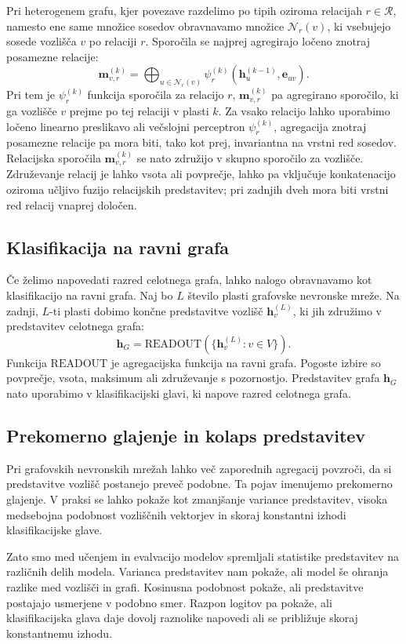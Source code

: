 Pri heterogenem grafu, kjer povezave razdelimo po tipih oziroma relacijah $r \in \mathcal{R}$, namesto ene same množice sosedov obravnavamo množice $\mathcal{N}_r(v)$, ki vsebujejo sosede vozlišča $v$ po relaciji $r$.
Sporočila se najprej agregirajo ločeno znotraj posamezne relacije:
\begin{equation}
    \mathbf{m}_{v,r}^{(k)} =
    \bigoplus_{u \in \mathcal{N}_r(v)}
    \psi_r^{(k)}
    \left(
        \mathbf{h}_u^{(k-1)},
        \mathbf{e}_{uv}
    \right).
\end{equation}
Pri tem je $\psi_r^{(k)}$ funkcija sporočila za relacijo $r$, $\mathbf{m}_{v,r}^{(k)}$ pa agregirano sporočilo, ki ga vozlišče $v$ prejme po tej relaciji v plasti $k$.
Za vsako relacijo lahko uporabimo ločeno linearno preslikavo ali večslojni perceptron $\psi_r^{(k)}$, agregacija znotraj posamezne relacije pa mora biti, tako kot prej, invariantna na vrstni red sosedov.
Relacijska sporočila $\mathbf{m}_{v,r}^{(k)}$ se nato združijo v skupno sporočilo za vozlišče.
Združevanje relacij je lahko vsota ali povprečje, lahko pa vključuje konkatenacijo oziroma učljivo fuzijo relacijskih predstavitev; pri zadnjih dveh mora biti vrstni red relacij vnaprej določen.

\subsection{Klasifikacija na ravni grafa}
\label{subsec:grafovska-klasifikacija}

Če želimo napovedati razred celotnega grafa, lahko nalogo obravnavamo kot klasifikacijo na ravni grafa.
Naj bo $L$ število plasti grafovske nevronske mreže. Na zadnji, $L$-ti plasti dobimo končne predstavitve vozlišč $\mathbf{h}_v^{(L)}$, ki jih združimo v predstavitev celotnega grafa:
\begin{equation}
    \mathbf{h}_G =
    \text{READOUT}
    \left(
        \{\mathbf{h}_v^{(L)} : v \in V\}
    \right).
\end{equation}
Funkcija $\text{READOUT}$ je agregacijska funkcija na ravni grafa.
Pogoste izbire so povprečje, vsota, maksimum ali združevanje s pozornostjo.
Predstavitev grafa $\mathbf{h}_G$ nato uporabimo v klasifikacijski glavi, ki napove razred celotnega grafa.

\subsection{Prekomerno glajenje in kolaps predstavitev}
\label{subsec:oversmoothing}

Pri grafovskih nevronskih mrežah lahko več zaporednih agregacij povzroči, da si predstavitve vozlišč postanejo preveč podobne.
Ta pojav imenujemo prekomerno glajenje.
V praksi se lahko pokaže kot zmanjšanje variance predstavitev, visoka medsebojna podobnost vozliščnih vektorjev in skoraj konstantni izhodi klasifikacijske glave.

Zato smo med učenjem in evalvacijo modelov spremljali statistike predstavitev na različnih delih modela.
Varianca predstavitev nam pokaže, ali model še ohranja razlike med vozlišči in grafi.
Kosinusna podobnost pokaže, ali predstavitve postajajo usmerjene v podobno smer.
Razpon logitov pa pokaže, ali klasifikacijska glava daje dovolj raznolike napovedi ali se približuje skoraj konstantnemu izhodu.
